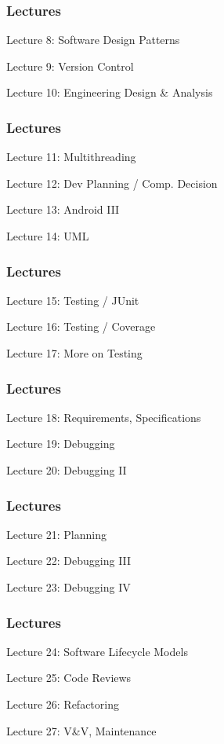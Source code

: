 \begin{frame}
\frametitle{Lectures}

{\LARGE
 
Lecture 8: Software Design Patterns

Lecture 9: Version Control

Lecture 10: Engineering Design \& Analysis 

}

\end{frame}

\begin{frame}
\frametitle{Lectures}

{\LARGE

Lecture 11: Multithreading

Lecture 12: Dev Planning / Comp. Decision

Lecture 13: Android III

Lecture 14: UML
}

\end{frame}

\begin{frame}
\frametitle{Lectures}

{\LARGE

Lecture 15: Testing / JUnit

Lecture 16: Testing / Coverage

Lecture 17: More on Testing

}

\end{frame}

\begin{frame}
\frametitle{Lectures}

{\LARGE

Lecture 18: Requirements, Specifications

Lecture 19: Debugging

Lecture 20: Debugging II
}

\end{frame}

\begin{frame}
\frametitle{Lectures}
{\LARGE

Lecture 21: Planning

Lecture 22: Debugging III

Lecture 23: Debugging IV
}

\end{frame}

\begin{frame}
\frametitle{Lectures}
{\LARGE

Lecture 24: Software Lifecycle Models

Lecture 25: Code Reviews

Lecture 26: Refactoring

Lecture 27: V\&V, Maintenance
}

\end{frame}


